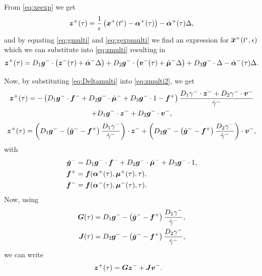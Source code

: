 \documentclass[../DC2019003Bouma.tex]{subfiles}
\begin{document}
From \eqref{eq:xeexp} we get
\begin{align}
{\boldsymbol{z}}^+(\tau) = \frac{1}{\epsilon}\left({\boldsymbol{x}}^{+}(t^\epsilon) - \boldsymbol{\alpha}^+(\tau)\right) -\dot{\boldsymbol{\alpha}}^+(\tau)\Delta,\label{eq:zmulti}
\end{align}
and by equating \eqref{eq:gmulti} and \eqref{eq:gexpmulti} we find an expression for $\overline{{\boldsymbol{x}}}^{+}(t^\epsilon,\epsilon)$ which we can substitute into \eqref{eq:zmulti} resulting in
\begin{align}
{\boldsymbol{z}}^+(\tau) = D_1{\boldsymbol{g}}^-\cdot\left({\boldsymbol{z}}^- (\tau) + \dot{\boldsymbol{\alpha}}^-\Delta \right) + D_2{\boldsymbol{g}}^-\cdot \left({\boldsymbol{v}}^- (\tau) + \dot{\boldsymbol{\mu}}^-\Delta \right) + D_3{\boldsymbol{g}}^-\cdot\Delta -\dot{\boldsymbol{\alpha}}^-(\tau)\Delta. \label{eq:zmulti2}
\end{align}

Now, by substituting \eqref{eq:Deltamulti} into \eqref{eq:zmulti2}, we get
\begin{multline}
{\boldsymbol{z}}^+(\tau) = - \left(D_1{\boldsymbol{g}}^-\cdot {\boldsymbol{f}}^{-} + D_2{\boldsymbol{g}}^-\cdot \dot{\boldsymbol{\mu}}^- + D_3{\boldsymbol{g}}^-\cdot 1 - {\boldsymbol{f}}^+\right)\frac{D_1\gamma^-\cdot{\boldsymbol{z}}^- + D_2\gamma^-\cdot{\boldsymbol{v}}^-}{\dot{\gamma}^-}\\ + D_1{\boldsymbol{g}}^-\cdot{\boldsymbol{z}}^- + D_2{\boldsymbol{g}}^-\cdot{\boldsymbol{v}}^-,
\end{multline}
\begin{align}
{\boldsymbol{z}}^+(\tau) = \left(D_1{\boldsymbol{g}}^- - \left(\dot{{\boldsymbol{g}}}^- - {\boldsymbol{f}}^+\right)\frac{D_1\gamma^-}{\dot{\gamma}^-}\right)\cdot{\boldsymbol{z}}^- + \left(D_2{\boldsymbol{g}}^- - \left(\dot{{\boldsymbol{g}}}^- - {\boldsymbol{f}}^+\right)\frac{D_2\gamma^-}{\dot{\gamma}^-}\right)\cdot{\boldsymbol{v}}^-,\label{eq:zmulti3}
\end{align}
with
\begin{align}
\dot{{\boldsymbol{g}}}^- &= D_1{\boldsymbol{g}}^-\cdot {\boldsymbol{f}}^- + D_2{\boldsymbol{g}}^-\cdot \dot{\boldsymbol{\mu}}^- + D_3{\boldsymbol{g}}^-\cdot 1,\\
{\boldsymbol{f}}^+ &={\boldsymbol{f}}(\boldsymbol{\alpha}^+(\tau),\boldsymbol{\mu}^+(\tau),\tau),\\
{\boldsymbol{f}}^- &={\boldsymbol{f}}(\boldsymbol{\alpha}^-(\tau),\boldsymbol{\mu}^-(\tau),\tau).
\end{align}
Now, using
\begin{align}
{\boldsymbol{G}}(\tau) &= D_1{\boldsymbol{g}}^- - \left(\dot{{\boldsymbol{g}}}^- - {\boldsymbol{f}}^+\right)\frac{D_1\gamma^-}{\dot{\gamma}^-},\\
{\boldsymbol{J}}(\tau) &= D_2{\boldsymbol{g}}^- - \left(\dot{{\boldsymbol{g}}}^- - {\boldsymbol{f}}^+\right)\frac{D_2\gamma^-}{\dot{\gamma}^-},
\end{align}
we can write 
\begin{align}
{\boldsymbol{z}}^+(\tau) &= {\boldsymbol{G}}{\boldsymbol{z}}^- + {\boldsymbol{J}}{\boldsymbol{v}}^-.
\end{align}
\end{document}
